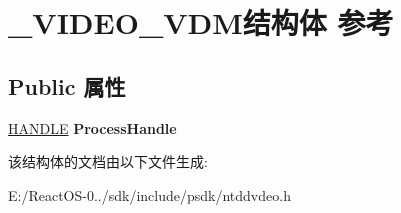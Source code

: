 \hypertarget{struct___v_i_d_e_o___v_d_m}{}\section{\+\_\+\+V\+I\+D\+E\+O\+\_\+\+V\+D\+M结构体 参考}
\label{struct___v_i_d_e_o___v_d_m}
\subsection*{Public 属性}
\begin{DoxyCompactItemize}
\item 
\mbox{\label{struct___v_i_d_e_o___v_d_m_a3bdb5cb46ff06b7faeb5f4153e53ae0f}} 
\hyperlink{interfacevoid}{H\+A\+N\+D\+LE} {\bfseries Process\+Handle}
\end{DoxyCompactItemize}


该结构体的文档由以下文件生成\+:\begin{DoxyCompactItemize}
\item 
E\+:/\+React\+O\+S-\/0../sdk/include/psdk/ntddvdeo.\+h\end{DoxyCompactItemize}
